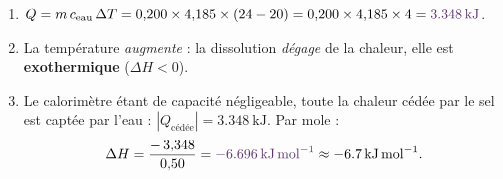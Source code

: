 \documentclass[11pt,a4paper]{article}
\newcommand{\rep}[1]{\textcolor{primarydark}{\textbf{#1}}}
\begin{document}
\begin{correction}
\begin{enumerate}[label=\alph*),leftmargin=2em,topsep=2pt,itemsep=2pt]
  \item $Q = m\,c_{\text{eau}}\,\Delta T = 0{,}200\times4{,}185\times(24-20) = 0{,}200\times4{,}185\times4 = \rep{\SI{3.348}{\kilo\joule}}$.
  \item La température \emph{augmente} : la dissolution \emph{dégage} de la chaleur, elle est \rep{exothermique} ($\Delta H<0$).
  \item Le calorimètre étant de capacité négligeable, toute la chaleur cédée par le sel est captée par
        l'eau : $|Q_{\text{cédée}}| = \SI{3.348}{\kilo\joule}$. Par mole :
        \[ \Delta H = \frac{-\,3{,}348}{0{,}50} = \rep{\SI{-6.696}{\kilo\joule\per\mol}} \approx \SI{-6.7}{\kilo\joule\per\mol}. \]
\end{enumerate}
\end{correction}
\end{document}
